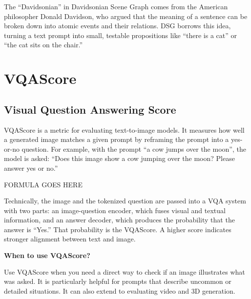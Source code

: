 \clearpage

\thispagestyle{customstyle}

{The “Davidsonian” in Davidsonian Scene Graph comes from the American philosopher Donald Davidson, who argued that the meaning of a sentence can
be broken down into atomic events and their relations. DSG borrows this idea, turning a text prompt into small, testable propositions like
“there is a cat” or “the cat sits on the chair.”}

\clearpage
\thispagestyle{genaistyle}
\section{VQAScore}
\subsection{Visual Question Answering Score}


VQAScore is a metric for evaluating text-to-image models. It measures how well a generated image matches a given prompt by reframing the prompt
into a yes-or-no question. For example, with the prompt “a cow jumps over the moon”, the model is asked: “Does this image show a cow jumping over
the moon? Please answer yes or no.”

\begin{center}
    FORMULA GOES HERE
\end{center}

Technically, the image and the tokenized question are passed into a VQA system with two parts: an image-question encoder, which fuses visual and
textual information, and an answer decoder, which produces the probability that the answer is “Yes.” That probability is the VQAScore. A higher score
indicates stronger alignment between text and image.

\textbf{When to use VQAScore?}

Use VQAScore when you need a direct way to check if an image illustrates what was asked. It is particularly helpful for prompts that describe uncommon
or detailed situations. It can also extend to evaluating video and 3D generation.

